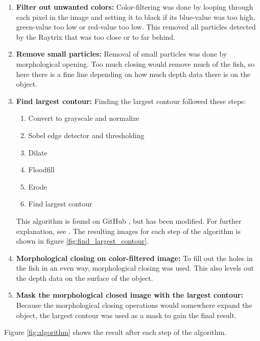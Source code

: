 \begin{enumerate}
    \item \textbf{Filter out unwanted colors:}
    Color-filtering was done by looping through each pixel in the image and setting it to black if its blue-value was too high, green-value too low or red-value too low. This removed all particles detected by the Raytrix that was too close or to far behind. 
    
    \item \textbf{Remove small particles:}
    Removal of small particles was done by morphological opening. Too much closing would remove much of the fish, so here there is a fine line depending on how much depth data there is on the object.
    
    \item \textbf{Find largest contour:} 
    Finding the largest contour followed these steps: 
    \begin{enumerate}[label*=\arabic*.]
        \item Convert to grayscale and normalize
        \item Sobel edge detector and thresholding
        \item Dilate
        \item Floodfill
        \item Erode
        \item Find largest contour
    \end{enumerate}
    This algorithm is found on GitHub \cite{website:largest_contour_code_github}, but has been modified. For further explanation, see \cite{website:largest_contour_code_explanation}.
    The resulting images for each step of the algorithm is shown in figure \ref{fig:find_largest_contour}.
    
    \item \textbf{Morphological closing on color-filtered image:}
    To fill out the holes in the fish in an even way, morphological closing was used. This also levels out the depth data on the surface of the object.
    
    \item \textbf{Mask the morphological closed image with the largest contour:}
    Because the morphological closing operations would somewhere expand the object, the largest contour was used as a mask to gain the final result. 
\end{enumerate}

Figure \ref{fig:algorithm} shows the result after each step of the algorithm.

